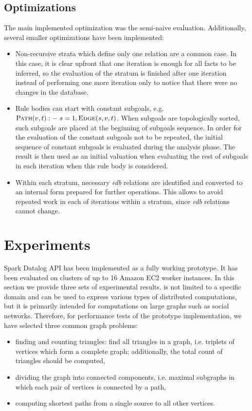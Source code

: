 \subsection{Optimizations}
The main implemented optimization was the semi-naive evaluation. Additionally, several smaller optimizations have been implemented:
\begin{itemize}
\item Non-recursive strata which define only one relation are a common case. In this case, it is clear upfront that one iteration is enough for all facts to be inferred, so the evaluation of the stratum is finished after one iteration instead of performing one more iteration only to notice that there were no changes in the database.
\item Rule bodies can start with constant subgoals, e.g. $\textsc{Path}(v,t) :-~s=1, \textsc{Edge}(s, v, t)$. When subgoals are topologically sorted, such subgoals are placed at the beginning of subgoals sequence. In order for the evaluation of the constant subgoals not to be repeated, the initial sequence of constant subgoals is evaluated during the analysis phase. The result is then used as an initial valuation when evaluating the rest of subgoals in each iteration when this rule body is considered.
\item Within each stratum, necessary \emph{edb} relations are identified and converted to an internal form prepared for further operations. This allows to avoid repeated work in each of iterations within a stratum, since \emph{edb} relations cannot change.
\end{itemize}

\section{Experiments}\label{s:impl_eval}
Spark Datalog API has been implemented as a fully working prototype. It has been evaluated on clusters of up to 16 Amazon EC2 worker instances. In this section we provide three sets of experimental results. \datalogra is not limited to a specific domain and can be used to express various types of distributed computations, but it is primarily intended for computations on large graphs such as social networks. Therefore, for performance tests of the prototype implementation, we have selected three common graph problems: 
\begin{itemize}
\item finding and counting triangles: find all triangles in a graph, i.e. triplets of vertices which form a complete graph; additionally, the total count of triangles should be computed,
\item dividing the graph into connected components, i.e. maximal subgraphs in which each pair of vertices is connected by a path,
\item computing shortest paths from a single source to all other vertices.
\end{itemize}

